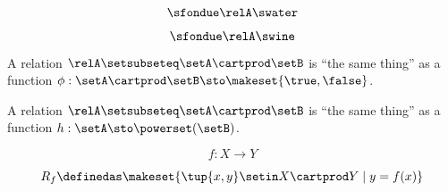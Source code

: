 {\begin{forslides}
        \begin{equation}
            \sfondue \relA \swater \label{eq:slides-17}
        \end{equation}

        \begin{equation}
            \sfondue \relA \swine \label{eq:slides-18}
        \end{equation}

        A relation $\relA \setsubseteq \setA \cartprod \setB$ is ``the same thing'' as a function $\phi : \setA \cartprod \setB \sto \makeset{\true, \false}$.

        A relation $\relA \setsubseteq \setA \cartprod \setB$ is ``the same thing'' as a function $h : \setA  \sto \powerset (\setB)$.

        \begin{equation}
            f : X \to Y
        \end{equation}

        \begin{equation}
            R_f \definedas \makeset{ \tup{x, y} \setin X \cartprod Y \mid y = f(x) }
        \end{equation}

    \end{forslides}
}

